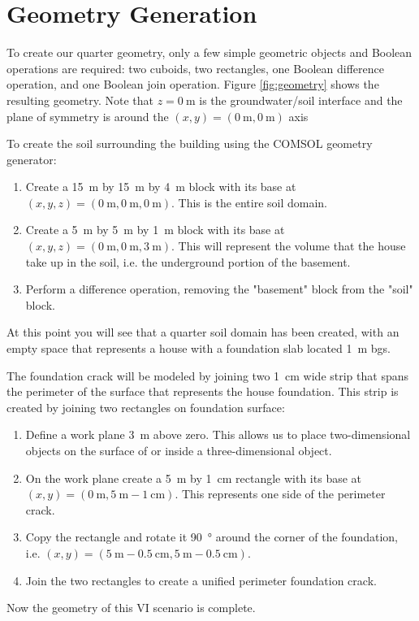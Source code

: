 \chapter{Geometry Generation}

To create our quarter geometry, only a few simple geometric objects and Boolean operations are required: two cuboids, two rectangles, one Boolean difference operation, and one Boolean join operation.
Figure \ref{fig:geometry} shows the resulting geometry.
Note that $z = \SI{0}{\metre}$ is the groundwater/soil interface and the plane of symmetry is around the $(x, y) = (\SI{0}{\metre},\SI{0}{\metre})$ axis\par

To create the soil surrounding the building using the COMSOL geometry generator:
\begin{enumerate}
  \item Create a \SI{15}{\metre} by \SI{15}{\metre} by \SI{4}{\metre} block with its base at $(x, y, z) = (\SI{0}{\metre},\SI{0}{\metre},\SI{0}{\metre})$. This is the entire soil domain.
  \item Create a \SI{5}{\metre} by \SI{5}{\metre} by \SI{1}{\metre} block with its base at $(x, y, z) = (\SI{0}{\metre},\SI{0}{\metre},\SI{3}{\metre})$. This will represent the volume that the house take up in the soil, i.e. the underground portion of the basement.
  \item Perform a difference operation, removing the "basement" block from the "soil" block.
\end{enumerate}
At this point you will see that a quarter soil domain has been created, with an empty space that represents a house with a foundation slab located \SI{1}{\metre} bgs.\par

The foundation crack will be modeled by joining two  \SI{1}{\centi\metre} wide strip that spans the perimeter of the surface that represents the house foundation.
This strip is created by joining two rectangles on foundation surface:
\begin{enumerate}
  \item Define a work plane \SI{3}{\metre} above zero. This allows us to place two-dimensional objects on the surface of or inside a three-dimensional object.
  \item On the work plane create a \SI{5}{\metre} by \SI{1}{\centi\metre} rectangle with its base at $(x, y) = (\SI{0}{\metre},\SI{5}{\metre} - \SI{1}{\centi\metre})$. This represents one side of the perimeter crack.
  \item Copy the rectangle and rotate it \SI{90}{\degree} around the corner of the foundation, i.e. $(x, y) = (\SI{5}{\metre} - \SI{0.5}{\centi\metre},\SI{5}{\metre} - \SI{0.5}{\centi\metre})$.
  \item Join the two rectangles to create a unified perimeter foundation crack.
\end{enumerate}
Now the geometry of this VI scenario is complete.\par
